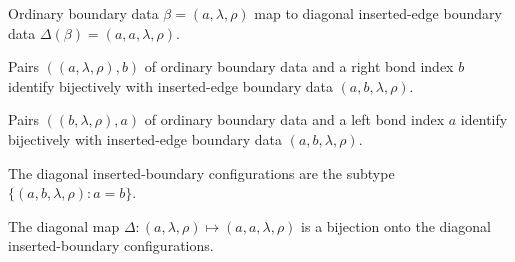 \begin{definition}%
    \label{def:peps_edgeBoundaryToInsertedBoundaryConfig}
    \leanok
    Ordinary boundary data $\beta=(a,\lambda,\rho)$ map to diagonal
    inserted-edge boundary data $\Delta(\beta)=(a,a,\lambda,\rho)$.
\end{definition}

\begin{definition}%
    \label{def:peps_edgeBoundaryRightIndexEquivInsertedBoundaryConfig}
    \leanok
    Pairs $((a,\lambda,\rho),b)$ of ordinary boundary data and a right bond
    index $b$ identify bijectively with inserted-edge boundary data
    $(a,b,\lambda,\rho)$.
\end{definition}

\begin{definition}%
    \label{def:peps_edgeBoundaryLeftIndexEquivInsertedBoundaryConfig}
    \leanok
    Pairs $((b,\lambda,\rho),a)$ of ordinary boundary data and a left bond
    index $a$ identify bijectively with inserted-edge boundary data
    $(a,b,\lambda,\rho)$.
\end{definition}

\begin{definition}%
    \label{def:peps_edgeDiagonalInsertedBoundaryConfig}
    \leanok
    The diagonal inserted-boundary configurations are the subtype
    $\{(a,b,\lambda,\rho):a=b\}$.
\end{definition}

\begin{definition}%
    \label{def:peps_edgeBoundaryConfigEquivDiagonalInsertedBoundaryConfig}
    \leanok
    The diagonal map $\Delta:(a,\lambda,\rho)\mapsto(a,a,\lambda,\rho)$ is a
    bijection onto the diagonal inserted-boundary configurations.
\end{definition}
